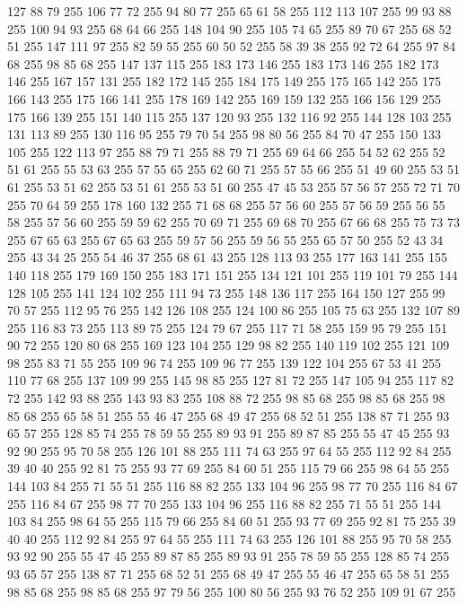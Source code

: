 127 88 79 255 106 77 72 255 94 80 77 255 65 61 58 255 112 113 107 255 99 93 88 255 100 94 93 255 68 64 66 255 148 104 90 255 105 74 65 255 89 70 67 255 68 52 51 255 147 111 97 255 82 59 55 255 60 50 52 255 58 39 38 255 92 72 64 255 97 84 68 255 98 85 68 255 147 137 115 255 183 173 146 255 183 173 146 255 182 173 146 255 167 157 131 255 182 172 145 255 184 175 149 255 175 165 142 255 175 166 143 255 175 166 141 255 178 169 142 255 169 159 132 255 166 156 129 255 175 166 139 255 151 140 115 255 137 120 93 255 132 116 92 255 144 128 103 255 131 113 89 255 130 116 95 255 79 70 54 255 98 80 56 255 84 70 47 255 150 133 105 255 122 113 97 255 88 79 71 255 88 79 71 255 69 64 66 255 54 52 62 255 52 51 61 255 55 53 63 255 57 55 65 255 62 60 71 255 57 55 66 255 51 49 60 255 53 51 61 255 53 51 62 255 53 51 61 255 53 51 60 255 47 45 53 255 57 56 57 255 72 71 70 255 70 64 59 255 178 160 132 255 71 68 68 255
57 56 60 255 57 56 59 255 56 55 58 255 57 56 60 255 59 59 62 255 70 69 71 255 69 68 70 255 67 66 68 255 75 73 73 255 67 65 63 255 67 65 63 255 59 57 56 255 59 56 55 255 65 57 50 255 52 43 34 255 43 34 25 255 54 46 37 255 68 61 43 255 128 113 93 255 177 163 141 255 155 140 118 255 179 169 150 255 183 171 151 255 134 121 101 255 119 101 79 255 144 128 105 255 141 124 102 255 111 94 73 255 148 136 117 255 164 150 127 255 99 70 57 255 112 95 76 255 142 126 108 255 124 100 86 255 105 75 63 255 132 107 89 255 116 83 73 255 113 89 75 255 124 79 67 255 117 71 58 255 159 95 79 255 151 90 72 255 120 80 68 255 169 123 104 255 129 98 82 255 140 119 102 255 121 109 98 255 83 71 55 255 109 96 74 255 109 96 77 255 139 122 104 255 67 53 41 255 110 77 68 255 137 109 99 255 145 98 85 255 127 81 72 255 147 105 94 255 117 82 72 255 142 93 88 255 143 93 83 255 108 88 72 255 98 85 68 255 98 85 68 255 98 85 68 255
65 58 51 255 55 46 47 255 68 49 47 255 68 52 51 255 138 87 71 255 93 65 57 255 128 85 74 255 78 59 55 255 89 93 91 255 89 87 85 255 55 47 45 255 93 92 90 255 95 70 58 255 126 101 88 255 111 74 63 255 97 64 55 255 112 92 84 255 39 40 40 255 92 81 75 255 93 77 69 255 84 60 51 255 115 79 66 255 98 64 55 255 144 103 84 255 71 55 51 255 116 88 82 255 133 104 96 255 98 77 70 255 116 84 67 255 116 84 67 255 98 77 70 255 133 104 96 255 116 88 82 255 71 55 51 255 144 103 84 255 98 64 55 255 115 79 66 255 84 60 51 255 93 77 69 255 92 81 75 255 39 40 40 255 112 92 84 255 97 64 55 255 111 74 63 255 126 101 88 255 95 70 58 255 93 92 90 255 55 47 45 255 89 87 85 255 89 93 91 255 78 59 55 255 128 85 74 255 93 65 57 255 138 87 71 255 68 52 51 255 68 49 47 255 55 46 47 255 65 58 51 255 98 85 68 255 98 85 68 255 97 79 56 255 100 80 56 255 93 76 52 255 109 91 67 255
